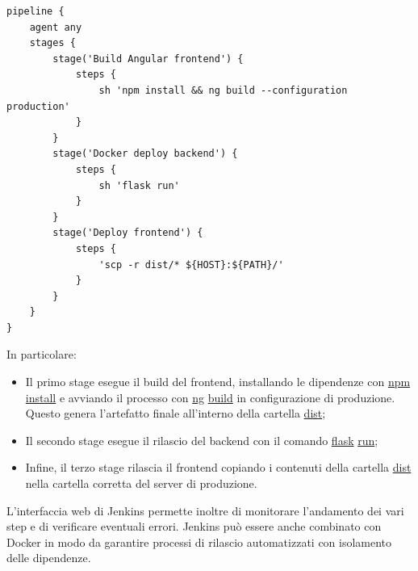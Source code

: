 \vspace{1mm}
\begin{lstlisting}[]
pipeline {
    agent any
    stages {
		stage('Build Angular frontend') {
			steps {
			    sh 'npm install && ng build --configuration production'
			}
		}
		stage('Docker deploy backend') {
			steps {
				sh 'flask run'
			}
		}
		stage('Deploy frontend') {
			steps {
			    'scp -r dist/* ${HOST}:${PATH}/'
			}
		}
    }
}
\end{lstlisting}

In particolare:

\begin{itemize}
  \item Il primo stage esegue il build del frontend, installando le dipendenze con \url{npm} \url{install} e avviando il processo con \url{ng} \url{build} in configurazione di produzione. Questo genera l'artefatto finale all'interno della cartella \url{dist};
  \item Il secondo stage esegue il rilascio del backend con il comando \url{flask} \url{run};
  \item Infine, il terzo stage rilascia il frontend copiando i contenuti della cartella \url{dist} nella cartella corretta del server di produzione.
\end{itemize}

L'interfaccia web di Jenkins permette inoltre di monitorare l'andamento dei vari step e di verificare eventuali errori. Jenkins può essere anche combinato con Docker \cite{docker} in modo da garantire processi di rilascio automatizzati con isolamento delle dipendenze.

